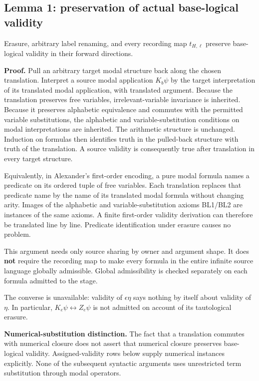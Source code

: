 \documentclass[
  11pt,
  letterpaper,
]{article}
\begin{document}
\subsection{Lemma 1: preservation of actual base-logical
validity}\label{lemma-1-preservation-of-actual-base-logical-validity}

Erasure, arbitrary label renaming, and every recording map
\(t_{H,\ell}\) preserve base-logical validity in their forward
directions.

\textbf{Proof.} Pull an arbitrary target modal structure back along the
chosen translation. Interpret a source modal application \(K_b\psi\) by
the target interpretation of its translated modal application, with
translated argument. Because the translation preserves free variables,
irrelevant-variable invariance is inherited. Because it preserves
alphabetic equivalence and commutes with the permitted variable
substitutions, the alphabetic and variable-substitution conditions on
modal interpretations are inherited. The arithmetic structure is
unchanged. Induction on formulas then identifies truth in the
pulled-back structure with truth of the translation. A source validity
is consequently true after translation in every target structure.

Equivalently, in Alexander's first-order encoding, a pure modal formula
names a predicate on its ordered tuple of free variables. Each
translation replaces that predicate name by the name of its translated
modal formula without changing arity. Images of the alphabetic and
variable-substitution axioms BL1/BL2 are instances of the same axioms. A
finite first-order validity derivation can therefore be translated line
by line. Predicate identification under erasure causes no problem.

This argument needs only source sharing by owner and argument shape. It
does \textbf{not} require the recording map to make every formula in the
entire infinite source language globally admissible. Global
admissibility is checked separately on each formula admitted to the
stage.

The converse is unavailable: validity of \(\epsilon\eta\) says nothing
by itself about validity of \(\eta\). In particular,
\(K_e\psi\leftrightarrow Z_e\psi\) is not admitted on account of its
tautological erasure.

\textbf{Numerical-substitution distinction.} The fact that a translation
commutes with numerical closure does not assert that numerical closure
preserves base-logical validity. Assigned-validity rows below supply
numerical instances explicitly. None of the subsequent syntactic
arguments uses unrestricted term substitution through modal operators.
\end{document}

